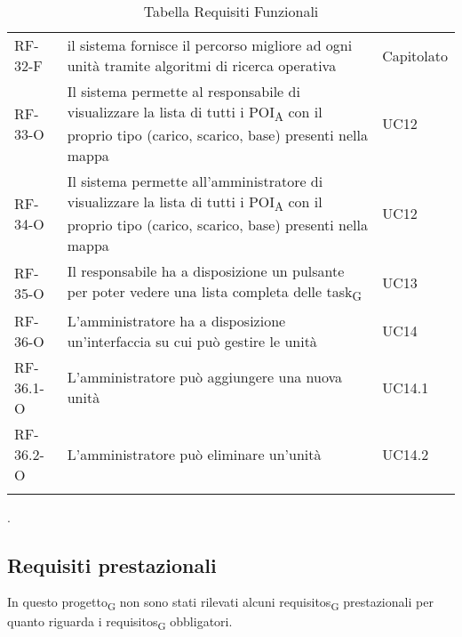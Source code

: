\begin{longtable}{ 
		>{}p{} 
		>{}p{}
		>{\centering}p{} }
RF-32-F & il sistema fornisce il percorso migliore ad ogni unità tramite algoritmi di ricerca operativa & Capitolato\tabularnewline
RF-33-O & Il sistema permette al responsabile di visualizzare la lista di tutti i \acrshort{POI}\textsubscript{A} con il proprio tipo (carico, scarico, base) presenti nella mappa & UC12\tabularnewline
RF-34-O & Il sistema permette all'amministratore di visualizzare la lista di tutti i \acrshort{POI}\textsubscript{A} con il proprio tipo (carico, scarico, base) presenti nella mappa & UC12\tabularnewline
RF-35-O & Il responsabile ha a disposizione un pulsante per poter vedere una lista completa delle \gls{task}\textsubscript{G} & UC13\tabularnewline
RF-36-O & L'amministratore ha a disposizione un'interfaccia su cui può gestire le unità & UC14\tabularnewline
RF-36.1-O & L'amministratore può aggiungere una nuova unità & UC14.1\tabularnewline
RF-36.2-O & L'amministratore può eliminare un'unità & UC14.2\tabularnewline
\caption{Tabella Requisiti Funzionali\label{ Tabella Requisiti Funzionali}}\\
\end{longtable}.
\newline 
\subsection{Requisiti prestazionali}
In questo \gls{progetto}\textsubscript{G} non sono stati rilevati alcuni \glspl{requisito}\textsubscript{G} prestazionali per quanto riguarda i \glspl{requisito}\textsubscript{G} obbligatori.
\newline 
